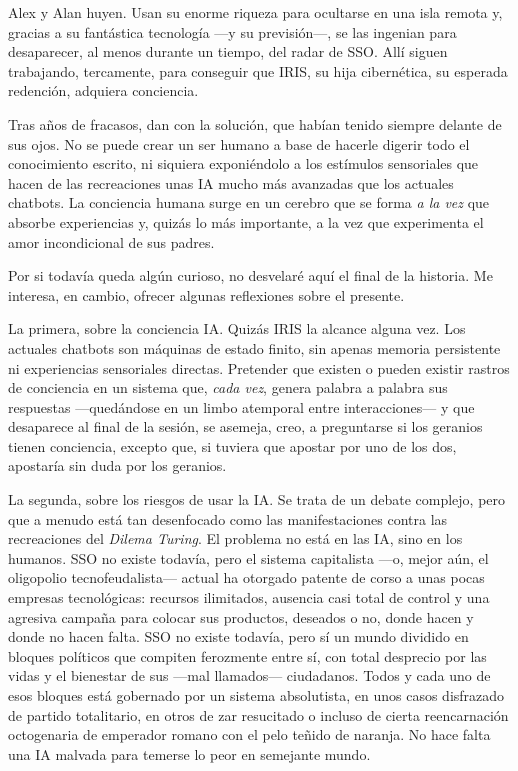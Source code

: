 \documentclass[11pt,a4paper]{article}
\begin{document}
Alex y Alan huyen. Usan su enorme riqueza para ocultarse en una isla remota y, gracias a su fantástica tecnología ---y su previsión---, se las ingenian para desaparecer, al menos durante un tiempo, del radar de SSO. Allí siguen trabajando, tercamente, para conseguir que IRIS, su hija cibernética, su esperada redención, adquiera conciencia. 

Tras años de fracasos, dan con la solución, que habían tenido siempre delante de sus ojos. No se puede crear un ser humano a base de hacerle digerir todo el conocimiento escrito, ni siquiera exponiéndolo a los estímulos sensoriales que hacen de las recreaciones unas IA mucho más avanzadas que los actuales chatbots. La conciencia humana surge en un cerebro que se forma \emph{a la vez} que absorbe experiencias y, quizás lo más importante, a la vez que experimenta el amor incondicional de sus padres.

Por si todavía queda algún curioso, no desvelaré aquí el final de la historia. Me interesa, en cambio, ofrecer algunas reflexiones sobre el presente. 

La primera, sobre la conciencia IA. Quizás IRIS la alcance alguna vez. Los actuales chatbots son máquinas de estado finito, sin apenas memoria persistente ni experiencias sensoriales directas. Pretender que existen o pueden existir rastros de conciencia en un sistema que, \emph{cada vez}, genera palabra a palabra sus respuestas ---quedándose en un limbo atemporal entre interacciones--- y que desaparece al final de la sesión, se asemeja, creo, a preguntarse si los geranios tienen conciencia, excepto que, si tuviera que apostar por uno de los dos, apostaría sin duda por los geranios.

La segunda, sobre los riesgos de usar la IA. Se trata de un debate complejo, pero que a menudo está tan desenfocado como las manifestaciones contra las recreaciones del \emph{Dilema Turing}. El problema no está en las IA, sino en los humanos. SSO no existe todavía, pero el sistema capitalista ---o, mejor aún, el oligopolio tecnofeudalista--- actual ha otorgado patente de corso a unas pocas empresas tecnológicas: recursos ilimitados, ausencia casi total de control y una agresiva campaña para colocar sus productos, deseados o no, donde hacen y donde no hacen falta. SSO no existe todavía, pero sí un mundo dividido en bloques políticos que compiten ferozmente entre sí, con total desprecio por las vidas y el bienestar de sus ---mal llamados--- ciudadanos. Todos y cada uno de esos bloques está gobernado por un sistema absolutista, en unos casos disfrazado de partido totalitario, en otros de zar resucitado o incluso de cierta reencarnación octogenaria de emperador romano con el pelo teñido de naranja. No hace falta una IA malvada para temerse lo peor en semejante mundo. 
\end{document}
